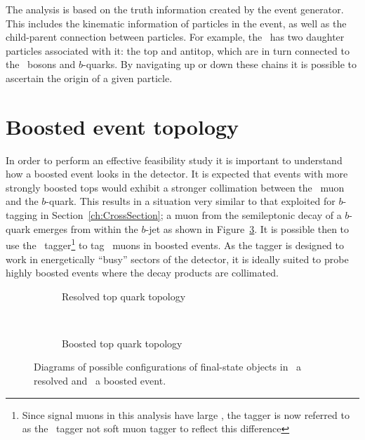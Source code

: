 The analysis is based on the truth information created by the event generator. This includes the kinematic information of particles in the event, as well as the child-parent connection between particles. For example, the \Zprime\ has two daughter particles associated with it: the top and antitop, which are in turn connected to the \W\ bosons and $b$-quarks. By navigating up or down these chains it is possible to ascertain the origin of a given particle.

\section{Boosted event topology}

In order to perform an effective feasibility study it is important to understand how a boosted event looks in the detector. It is expected that events with more strongly boosted tops would exhibit a stronger collimation between the \W\ muon and the $b$-quark. This results in a situation very similar to that exploited for $b$-tagging in Section~\ref{ch:CrossSection}; a muon from the semileptonic decay of a $b$-quark emerges from within the $b$-jet as shown in Figure~\ref{fig:SimpleAngularDiagrams}. It is possible then to use the \xsm\ tagger\footnote{Since signal muons in this analysis have large \pt, the tagger is now referred to as the \xsm\ tagger not soft muon tagger to reflect this difference} to tag \W\ muons in boosted events. As the tagger is designed to work in energetically ``busy'' sectors of the detector, it is ideally suited to probe highly boosted events where the decay products are collimated.

\begin{figure}[htbp]
  \centering
  \begin{subfigure}[b]{0.46\textwidth}
    \centering
      \def\svgwidth{184pt}
      
      \caption{Resolved top quark topology}\label{fig:NonBoostedDiagram}
  \end{subfigure}
~%
  \begin{subfigure}[b]{0.46\textwidth}
    \centering
      \def\svgwidth{147pt}
      
      \caption{Boosted top quark topology}\label{fig:BoostedDiagram}
  \end{subfigure}
  \caption[Diagrams of possible configurations of final-state objects in a boosted and a resolved event.]{Diagrams of possible configurations of final-state objects in~ a resolved and~ a boosted event.}\label{fig:SimpleAngularDiagrams}
\end{figure}


